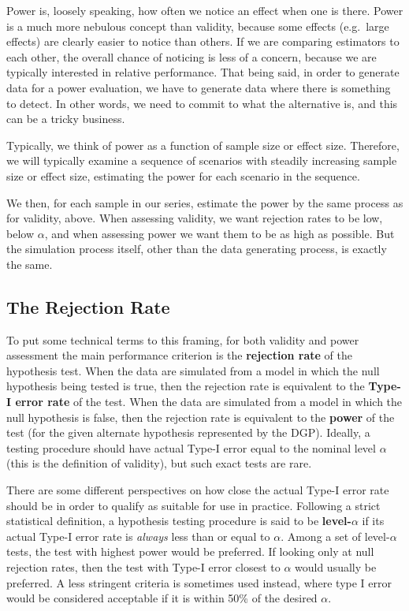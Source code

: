\documentclass[
]{book}
\begin{document}
Power is, loosely speaking, how often we notice an effect when one is there.
Power is a much more nebulous concept than validity, because some effects (e.g.~large effects) are clearly easier to notice than others.
If we are comparing estimators to each other, the overall chance of noticing is less of a concern, because we are typically interested in relative performance.
That being said, in order to generate data for a power evaluation, we have to generate data where there is something to detect.
In other words, we need to commit to what the alternative is, and this can be a tricky business.

Typically, we think of power as a function of sample size or effect size. Therefore, we will typically examine a sequence of scenarios with steadily increasing sample size or effect size, estimating the power for each scenario in the sequence.

We then, for each sample in our series, estimate the power by the same process as for validity, above.
When assessing validity, we want rejection rates to be low, below \(\alpha\), and when assessing power we want them to be as high as possible. But the simulation process itself, other than the data generating process, is exactly the same.

\subsection{The Rejection Rate}\label{the-rejection-rate}

To put some technical terms to this framing, for both validity and power assessment the main performance criterion is the \textbf{rejection rate} of the hypothesis test. When the data are simulated from a model in which the null hypothesis being tested is true, then the rejection rate is equivalent to the \textbf{Type-I error rate} of the test. When the data are simulated from a model in which the null hypothesis is false, then the rejection rate is equivalent to the \textbf{power} of the test (for the given alternate hypothesis represented by the DGP).
Ideally, a testing procedure should have actual Type-I error equal to the nominal level \(\alpha\) (this is the definition of validity), but such exact tests are rare.

There are some different perspectives on how close the actual Type-I error rate should be in order to qualify as suitable for use in practice. Following a strict statistical definition, a hypothesis testing procedure is said to be \textbf{level-\(\alpha\)} if its actual Type-I error rate is \emph{always} less than or equal to \(\alpha\).
Among a set of level-\(\alpha\) tests, the test with highest power would be preferred.
If looking only at null rejection rates, then the test with Type-I error closest to \(\alpha\) would usually be preferred.
A less stringent criteria is sometimes used instead, where type I error would be considered acceptable if it is within 50\% of the desired \(\alpha\).
\end{document}
